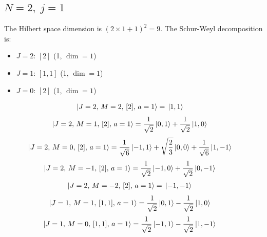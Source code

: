 \documentclass{article}
\begin{document}
\subsection*{$N=2,\; j=1$}

The Hilbert space dimension is $(2\times 1 +1)^{2}=9$.
The Schur-Weyl decomposition is:
\begin{itemize}
  \item $J=2$: $[2]$ (1, $\dim = 1$)
  \item $J=1$: $[1,1]$ (1, $\dim = 1$)
  \item $J=0$: $[2]$ (1, $\dim = 1$)
\end{itemize}

\begin{equation*}
\begin{aligned}
\ket{J=2,\,M=2,\,[2],\,a=1} = \; &\ket{1,1}
\end{aligned}
\end{equation*}
\begin{equation*}
\begin{aligned}
\ket{J=2,\,M=1,\,[2],\,a=1} = \; &\frac{1}{\sqrt{2}} \ket{0,1} + \frac{1}{\sqrt{2}} \ket{1,0}
\end{aligned}
\end{equation*}
\begin{equation*}
\begin{aligned}
\ket{J=2,\,M=0,\,[2],\,a=1} = \; &\frac{1}{\sqrt{6}} \ket{-1,1} + \sqrt{\frac{2}{3}} \ket{0,0} + \frac{1}{\sqrt{6}} \ket{1,-1}
\end{aligned}
\end{equation*}
\begin{equation*}
\begin{aligned}
\ket{J=2,\,M=-1,\,[2],\,a=1} = \; &\frac{1}{\sqrt{2}} \ket{-1,0} + \frac{1}{\sqrt{2}} \ket{0,-1}
\end{aligned}
\end{equation*}
\begin{equation*}
\begin{aligned}
\ket{J=2,\,M=-2,\,[2],\,a=1} = \; &\ket{-1,-1}
\end{aligned}
\end{equation*}
\begin{equation*}
\begin{aligned}
\ket{J=1,\,M=1,\,[1,1],\,a=1} = \; &\frac{1}{\sqrt{2}} \ket{0,1} - \frac{1}{\sqrt{2}} \ket{1,0}
\end{aligned}
\end{equation*}
\begin{equation*}
\begin{aligned}
\ket{J=1,\,M=0,\,[1,1],\,a=1} = \; &\frac{1}{\sqrt{2}} \ket{-1,1} - \frac{1}{\sqrt{2}} \ket{1,-1}
\end{aligned}
\end{equation*}
\end{document}
